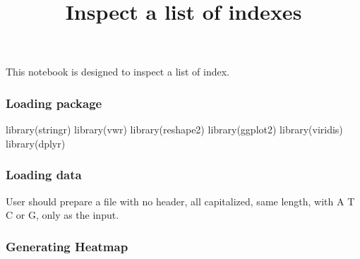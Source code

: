 \documentclass[
]{article}
\title{Inspect a list of indexes}
\author{}
\date{\vspace{-2.5em}}
\newenvironment{Shaded}{\begin{snugshade}}{\end{snugshade}}
\newcommand{\AttributeTok}[1]{\textcolor[rgb]{0.77,0.63,0.00}{#1}}
\newcommand{\FunctionTok}[1]{\textcolor[rgb]{0.00,0.00,0.00}{#1}}
\newcommand{\NormalTok}[1]{#1}
\newcommand{\OtherTok}[1]{\textcolor[rgb]{0.56,0.35,0.01}{#1}}
\newcommand{\SpecialCharTok}[1]{\textcolor[rgb]{0.00,0.00,0.00}{#1}}
\newcommand{\StringTok}[1]{\textcolor[rgb]{0.31,0.60,0.02}{#1}}
\begin{document}
\maketitle

This notebook is designed to inspect a list of index.

\hypertarget{loading-package}{%
\subsubsection{Loading package}\label{loading-package}}

\begin{Shaded}
\begin{Highlighting}[]
\FunctionTok{library}\NormalTok{(stringr)}
\FunctionTok{library}\NormalTok{(vwr)}
\FunctionTok{library}\NormalTok{(reshape2)}
\FunctionTok{library}\NormalTok{(ggplot2)       }
\FunctionTok{library}\NormalTok{(viridis)}
\FunctionTok{library}\NormalTok{(dplyr)}
\end{Highlighting}
\end{Shaded}

\hypertarget{loading-data}{%
\subsubsection{Loading data}\label{loading-data}}

User should prepare a file with no header, all capitalized, same length,
with A T C or G, only as the input.

\begin{Shaded}
\end{Shaded}

\hypertarget{generating-heatmap}{%
\subsubsection{Generating Heatmap}\label{generating-heatmap}}
\end{document}
